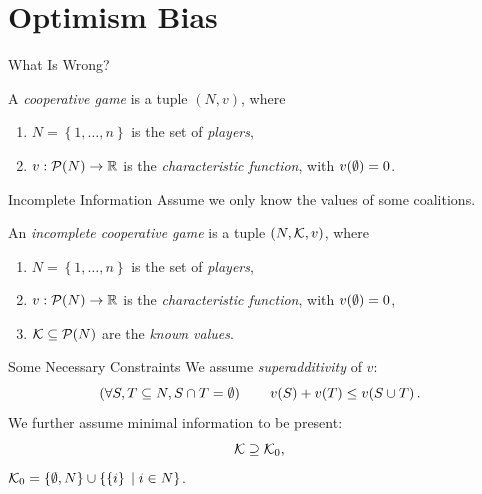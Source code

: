 \documentclass[]{beamer}
\begin{document}
\section{Optimism Bias}

\begin{frame}{What Is Wrong?}
	\begin{definition}
		A \emph{cooperative game} is a tuple $ \left( N,v \right) $, where \begin{enumerate}
			\item $ N = \left\{ 1, \ldots, n \right\} $ is the set of \emph{players},
			\item $ v: \mathcal{P}\!\left(N\right) \to \mathbb{R} $ is the \emph{characteristic function}, with $ v\!\left(\emptyset\right) = 0 $.
		\end{enumerate}
	\end{definition}
\end{frame}

\begin{frame}{Incomplete Information}
	Assume we only know the values of some coalitions.
	\vspace{3em}
	\begin{definition}
		An \emph{incomplete cooperative game} is a tuple $ \left( N,\mathcal{K},v \right) $, where \begin{enumerate}
			\item $ N = \left\{ 1, \ldots, n \right\} $ is the set of \emph{players},
			\item $ v: \mathcal{P}\!\left(N\right) \to \mathbb{R} $ is the \emph{characteristic function}, with $ v\!\left(\emptyset\right) = 0 $,
			\item $ \mathcal{K} \subseteq \mathcal{P}\!\left(N\right) $ are the \emph{known values}.
		\end{enumerate}
	\end{definition}
\end{frame}

\begin{frame}{Some Necessary Constraints}
	We assume \emph{superadditivity} of $ v $: \[
		\left( \forall S,T \subseteq N, S \cap T = \emptyset \right)\qquad v\!\left(S\right) + v\!\left(T\right) \leq v\!\left(S \cup T\right).
	\]
	We further assume minimal information to be present: \[
		\mathcal{K} \supseteq \mathcal{K}_0,
	\]
	$ \mathcal{K}_0 = \left\{ \emptyset, N \right\} \cup \left\{ \left\{ i \right\} \;\vert\; i \in N \right\} $.
\end{frame}


\end{document}
